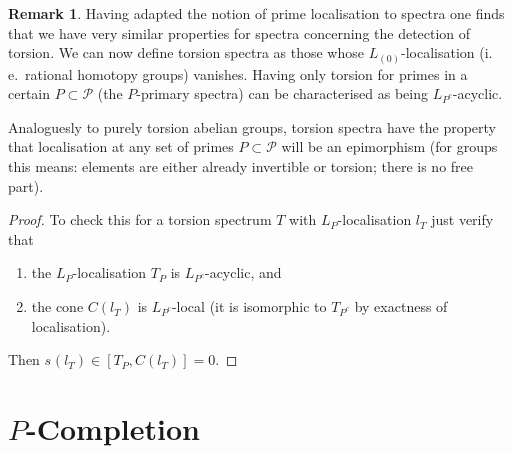 \documentclass[english]{scrartcl}
\theoremstyle{definition}
\newtheorem*{Rem}{Remark}
\theoremstyle{remark}
\newcommand*{\idest}{i.\,e.\ }
\newcommand*{\Cone}[1]{C(#1)}
\newcommand*{\conem}[2][]{s^{#1}(#2)}  %
\newcommand*{\Ps}{P}  %
\newcommand*{\PS}{\mathcal{P}} %
\newcommand*{\LP}[1][\Ps]{L_{#1}}  %
\begin{document}
\begin{Rem}
Having adapted the notion of prime localisation to spectra one finds
that we have very similar properties for spectra concerning the
detection of torsion. We can now define torsion spectra as those whose
$\LP[(0)]$-localisation (\idest rational homotopy groups) vanishes.
Having only torsion for primes in a certain $\Ps\subset\PS$ (the
$\Ps$-primary spectra) can be characterised as being
$\LP[\Ps^c]$-acyclic.

Analoguesly to purely torsion abelian groups, torsion spectra have the
property that localisation at any set of primes $\Ps\subset\PS$ will
be an epimorphism (for groups this means: elements are either already
invertible or torsion; there is no free part).
\begin{proof}
  To check this for a torsion spectrum $T$ with $\LP$-localisation
  $l_T$ just verify that
  \begin{enumerate}[nosep]
  \item the $\LP$-localisation $T_{\Ps}$ is
    $\LP[\Ps^c]$-acyclic, and
  \item the cone $\Cone {l_T}$ is $\LP[\Ps^c]$-local
    (it is isomorphic to $T_{\Ps^c}$ by exactness of
    localisation).
  \end{enumerate}
  Then $\conem {l_T} \in [T_{\Ps}, \Cone {l_T}]=0$.
\end{proof}
\end{Rem}

\section{$\Ps$-Completion}
\end{document}
